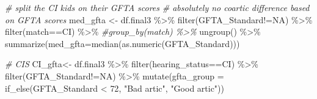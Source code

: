 \documentclass[
]{article}
\newenvironment{Shaded}{\begin{snugshade}}{\end{snugshade}}
\newcommand{\AttributeTok}[1]{\textcolor[rgb]{0.77,0.63,0.00}{#1}}
\newcommand{\CommentTok}[1]{\textcolor[rgb]{0.56,0.35,0.01}{\textit{#1}}}
\newcommand{\DecValTok}[1]{\textcolor[rgb]{0.00,0.00,0.81}{#1}}
\newcommand{\FunctionTok}[1]{\textcolor[rgb]{0.00,0.00,0.00}{#1}}
\newcommand{\NormalTok}[1]{#1}
\newcommand{\OtherTok}[1]{\textcolor[rgb]{0.56,0.35,0.01}{#1}}
\newcommand{\SpecialCharTok}[1]{\textcolor[rgb]{0.00,0.00,0.00}{#1}}
\newcommand{\StringTok}[1]{\textcolor[rgb]{0.31,0.60,0.02}{#1}}
\begin{document}
\begin{Shaded}
\begin{Highlighting}[]
\CommentTok{\# split the CI kids on their GFTA scores}
\CommentTok{\# absolutely no coartic difference based on GFTA scores}
\NormalTok{med\_gfta }\OtherTok{\textless{}{-}}\NormalTok{ df.final3 }\SpecialCharTok{\%\textgreater{}\%}
  \FunctionTok{filter}\NormalTok{(GFTA\_Standard}\SpecialCharTok{!=}\StringTok{\textquotesingle{}NA\textquotesingle{}}\NormalTok{) }\SpecialCharTok{\%\textgreater{}\%}
  \FunctionTok{filter}\NormalTok{(match}\SpecialCharTok{==}\StringTok{\textquotesingle{}CI\textquotesingle{}}\NormalTok{) }\SpecialCharTok{\%\textgreater{}\%}
  \CommentTok{\#group\_by(match) \%\textgreater{}\%}
  \FunctionTok{ungroup}\NormalTok{() }\SpecialCharTok{\%\textgreater{}\%}
  \FunctionTok{summarize}\NormalTok{(}\AttributeTok{med\_gfta=}\FunctionTok{median}\NormalTok{(}\FunctionTok{as.numeric}\NormalTok{(GFTA\_Standard)))}

\CommentTok{\# CIS}
\NormalTok{CI\_gfta}\OtherTok{\textless{}{-}}\NormalTok{ df.final3 }\SpecialCharTok{\%\textgreater{}\%}
  \FunctionTok{filter}\NormalTok{(hearing\_status}\SpecialCharTok{==}\StringTok{\textquotesingle{}CI\textquotesingle{}}\NormalTok{) }\SpecialCharTok{\%\textgreater{}\%}
  \FunctionTok{filter}\NormalTok{(GFTA\_Standard}\SpecialCharTok{!=}\StringTok{\textquotesingle{}NA\textquotesingle{}}\NormalTok{) }\SpecialCharTok{\%\textgreater{}\%}
  \FunctionTok{mutate}\NormalTok{(}\AttributeTok{gfta\_group =} \FunctionTok{if\_else}\NormalTok{(GFTA\_Standard }\SpecialCharTok{\textless{}} \DecValTok{72}\NormalTok{, }
                            \StringTok{"Bad artic"}\NormalTok{, }
                            \StringTok{"Good artic"}\NormalTok{))}


\end{Highlighting}
\end{Shaded}
\end{document}
